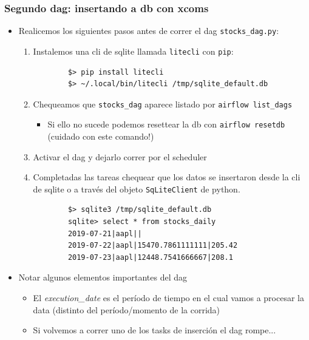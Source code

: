 \documentclass[leqno, 10pt, envcountsect]{beamer}
\numberwithin{equation}{section}
\theoremstyle{definition}
\theoremstyle{example}
\numberwithin{figure}{section}
\numberwithin{table}{section}
\let\olditem\item
\renewcommand{\item}{%
\olditem\vspace{1pt}}
\begin{document}
\begin{frame}[fragile=singleslide]
  \frametitle{Segundo dag: insertando a db con xcoms}
  \begin{itemize}
    \item Realicemos los siguientes pasos antes de correr el dag
      \texttt{stocks_dag.py}:
      \begin{enumerate}
        \item Instalemos una cli de sqlite llamada \texttt{litecli} con \texttt{pip}:
        \begin{verbatim}
        $> pip install litecli
        $> ~/.local/bin/litecli /tmp/sqlite_default.db
        \end{verbatim}
      \item Chequeamos que \texttt{stocks_dag} aparece listado por
        \texttt{airflow list_dags}
        \begin{itemize}
          \item Si ello no sucede podemos resettear la db con \texttt{airflow
            resetdb} (cuidado con este comando!)
        \end{itemize}
      \item Activar el dag y dejarlo correr por el scheduler
      \item Completadas las tareas chequear que los datos se insertaron desde
        la cli de sqlite o a través del objeto \texttt{SqLiteClient} de python.
        \begin{verbatim}
        $> sqlite3 /tmp/sqlite_default.db
        sqlite> select * from stocks_daily
        2019-07-21|aapl||
        2019-07-22|aapl|15470.7861111111|205.42
        2019-07-23|aapl|12448.7541666667|208.1
        \end{verbatim}
      \end{enumerate}
    \item Notar algunos elementos importantes del dag
      \begin{itemize}
        \item El \textit{execution_date} es el período de tiempo en el cual
          vamos a procesar la data (distinto del período/momento de la corrida)
        \item Si volvemos a correr uno de los tasks de inserción el dag
          rompe...
      \end{itemize}
  \end{itemize}
\end{frame}
\end{document}
